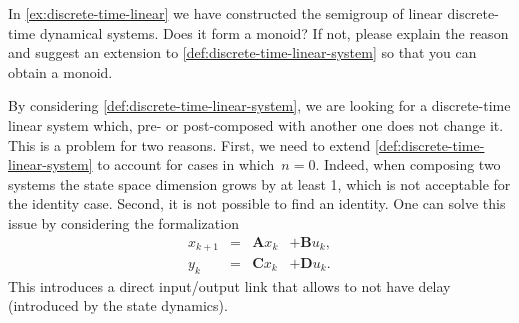 \begin{exercise}
    In \cref{ex:discrete-time-linear} we have constructed the semigroup of linear discrete-time dynamical systems.
    Does it form a monoid? If not, please explain the reason and suggest an extension to \cref{def:discrete-time-linear-system} so that you can obtain a monoid.
\end{exercise}
\begin{solution}
    By considering \cref{def:discrete-time-linear-system}, we are looking for a discrete-time linear system which, pre- or post-composed with another one does not change it.
    This is a problem for two reasons.
    First, we need to extend \cref{def:discrete-time-linear-system} to account for cases in which~$n=0$.
    Indeed, when composing two systems the state space dimension grows by at least 1, which is not acceptable for the identity case.
    Second, it is not possible to find an identity.
    One can solve this issue by considering the formalization
    \begin{equation}
        \label{eq:discrete-time-dynamics-D}
        \begin{aligned}
            x_{k+1} &=& \mathbf{A} x_k & + \mathbf{B} u_k, \\
            y_{k}   &=& \mathbf{C} x_k & + \mathbf{D} u_k.
        \end{aligned}
    \end{equation}
    This introduces a direct input/output link that allows to not have delay (introduced by the state dynamics).
\end{solution}

